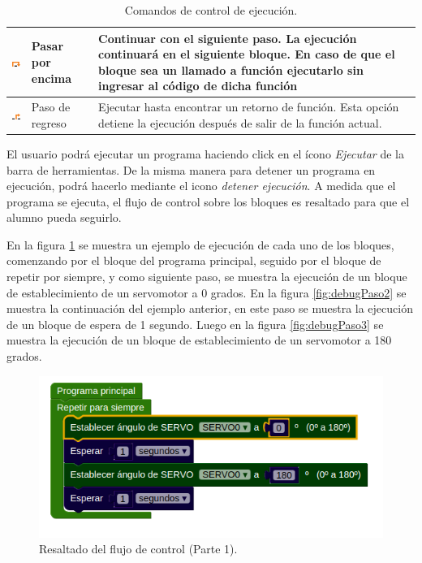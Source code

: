 \begin{table}[!htbp]
\begin{tabular}{ >{\centering\arraybackslash}m{2cm} >{\arraybackslash}m{2cm} >{\arraybackslash}m{7cm}}
		\hline
		\includegraphics{./Figures/step_over.PNG} & Pasar por encima & Continuar con el siguiente paso. La ejecución continuará en el siguiente bloque. En caso de que el bloque sea un llamado a función ejecutarlo sin ingresar al código de dicha función \\
		\hline
		\includegraphics{./Figures/step_return.PNG} & Paso de regreso & 
		Ejecutar hasta encontrar un retorno de función. Esta opción detiene la ejecución después de salir de la función actual. \\
		\hline
	\end{tabular}
	\par\caption{Comandos de control de ejecución.}
	\label{tabla:Comandos}
\end{table}

El usuario podrá ejecutar un programa haciendo click en el ícono \emph{Ejecutar} de la barra de herramientas. De la misma manera para detener un programa en ejecución, podrá hacerlo mediante el icono \emph{detener ejecución}.
A medida que el programa se ejecuta, el flujo de control sobre los bloques es resaltado para que el alumno pueda seguirlo. 

En la figura \ref{fig:debugPaso1} se muestra un ejemplo de ejecución de cada uno de los bloques, comenzando por el bloque del programa principal, seguido por el bloque de repetir por siempre, y como siguiente paso, se muestra la ejecución de un bloque de establecimiento de un servomotor a 0 grados. En la figura \ref{fig:debugPaso2} se muestra la continuación del ejemplo anterior, en este paso se
muestra la ejecución de un bloque de espera de 1 segundo. Luego en la figura \ref{fig:debugPaso3} se
muestra la ejecución de un bloque de establecimiento de un servomotor a 180 grados.


\begin{figure}[!htbp]
	\begin{center}  %
		\includegraphics[scale=.60]{./Figures/debugPaso1.PNG}
		\par\caption{Resaltado del flujo de control (Parte 1).}\label{fig:debugPaso1}
	\end{center}
\end{figure}

